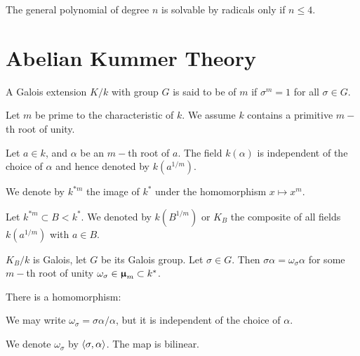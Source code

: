  \begin{cor}
    The general polynomial of degree $n$ is solvable by radicals only if $n\leqslant4$.
  \end{cor}

\newpage\section{Abelian Kummer Theory}

  \begin{defn}
    A Galois extension $K/k$ with group $G$ is said to be of  $m$ if $\sigma^m=1$ for all $\sigma\in G$.
  \end{defn}

    Let $m$ be prime to the characteristic of $k$. We assume $k$ contains a primitive $m-$th root of unity.

    Let $a\in k$, and $\alpha$ be an $m-$th root of $a$. The field $k(\alpha)$ is independent of the choice of $\alpha$ and hence denoted by $k(a^{1/m})$.

    We denote by $k^{\ast m}$ the image of $k^{\ast}$ under the homomorphism $x\mapsto x^m$.

    Let $k^{\ast m}\subset B< k^{\ast}$. We denoted by $k(B^{1/m})$ or $K_B$ the composite of all fields $k(a^{1/m})$ with $a\in B$.

    $K_B/k$ is Galois, let $G$ be its Galois group. Let $\sigma\in G$. Then $\sigma\alpha=\omega_{\sigma}\alpha$ for some $m-$th root of unity $\omega_{\sigma}\in\bm{\upmu}_m\subset k^{\ast}$.

    There is a homomorphism:

    We may write $\omega_{\sigma}=\sigma\alpha/\alpha$, but it is independent of the choice of $\alpha$.

    We denote $\omega_{\sigma}$ by $\langle\sigma,\alpha\rangle$. The map
    is bilinear.

